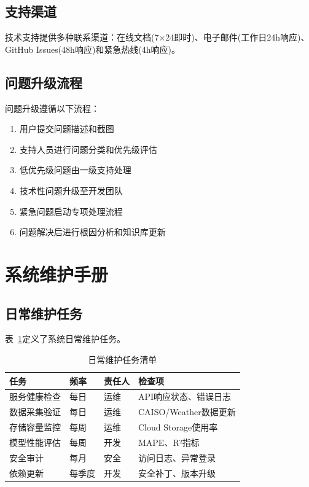 \subsection{支持渠道}

技术支持提供多种联系渠道：在线文档(7×24即时)、电子邮件(工作日24h响应)、GitHub Issues(48h响应)和紧急热线(4h响应)。

\subsection{问题升级流程}

问题升级遵循以下流程：

\begin{enumerate}
    \item 用户提交问题描述和截图
    \item 支持人员进行问题分类和优先级评估
    \item 低优先级问题由一级支持处理
    \item 技术性问题升级至开发团队
    \item 紧急问题启动专项处理流程
    \item 问题解决后进行根因分析和知识库更新
\end{enumerate}

\section{系统维护手册}

\subsection{日常维护任务}

表~\ref{tab:maintenance_tasks}定义了系统日常维护任务。

\begin{table}[htbp]
    \centering
    \caption{日常维护任务清单}
    \label{tab:maintenance_tasks}
    \begin{tabular}{llll}
        \toprule
        \textbf{任务} & \textbf{频率} & \textbf{责任人} & \textbf{检查项}      \\
        \midrule
        服务健康检查      & 每日          & 运维           & API响应状态、错误日志      \\
        数据采集验证      & 每日          & 运维           & CAISO/Weather数据更新 \\
        存储容量监控      & 每周          & 运维           & Cloud Storage使用率  \\
        模型性能评估      & 每周          & 开发           & MAPE、R²指标         \\
        安全审计        & 每月          & 安全           & 访问日志、异常登录         \\
        依赖更新        & 每季度         & 开发           & 安全补丁、版本升级         \\
        \bottomrule
    \end{tabular}
\end{table}

